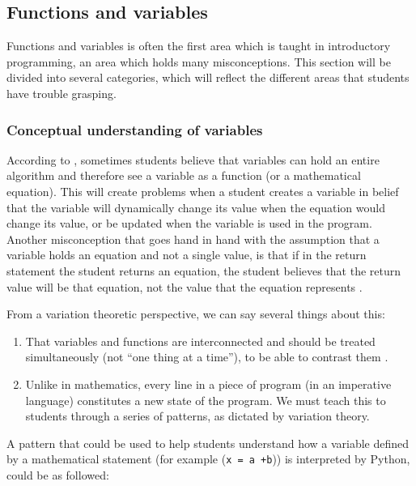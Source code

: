 \subsection{Functions and variables}

Functions and variables is often the first area which is taught in 
introductory programming, an area which holds many misconceptions. This 
section will be divided into several categories, which will reflect the 
different areas that students have trouble grasping.  


\subsubsection{Conceptual understanding of variables}
According to \textcite{
Kohn2017VariableEvaluation,Plass2015Variables,Doukakis2007}, 
sometimes students believe that variables can hold an entire algorithm and 
therefore see a variable as a function (or a mathematical equation). This 
will 
create problems when a student creates a variable in belief that the 
variable 
will dynamically change its value when the equation would change its value, 
or be updated
when the variable is used in the program. Another misconception that goes 
hand in hand with the assumption that a 
variable holds an equation and not a single value, is that if in the return 
statement the student returns an equation, the student believes that the 
return 
value will be that equation, not the value that the equation represents 
\parencite{Kohn2017VariableEvaluation}.

From a variation theoretic perspective, we can say several things about 
this:
\begin{enumerate}
  \item That variables and functions are interconnected and should be 
treated 
    simultaneously (not \enquote{one thing at a time}), to be able to 
contrast 
    them \parencite[\cf][Ch~6, pp~167--168]{NCOL}.
  \item Unlike in mathematics, every line in a piece of program (in an 
    imperative language) constitutes a new state of the program.
    We must teach this to students through a series of patterns, as 
dictated by 
    variation theory.
\end{enumerate}

A pattern that could be used to help students understand how a variable 
defined by a mathematical statement (for example (\texttt{x = a
+b})) is interpreted by Python, could be as followed:

